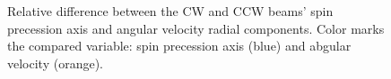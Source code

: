 \begin{figure}[!h]
	\centering
	\caption{Relative difference between the CW and CCW beams' spin precession axis and angular velocity radial components.
		Color marks the compared variable: spin precession axis (blue) and abgular velocity (orange).\label{fig:Lin_test_rel_diff}}
\end{figure}
